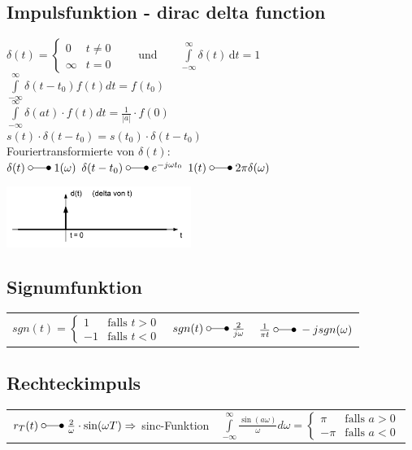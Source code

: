 	\subsection{Impulsfunktion - dirac delta function}
		\begin{minipage}{10cm}
			$\delta (t)=\begin{cases} 0 & t\ne 0\\\infty & t=0\end{cases} \qquad
			\text{und} \qquad \int\limits_{-\infty}^\infty \delta(t) \, \mathrm dt = 1 $\\
			$\int\limits_{-\infty}^{\infty}\delta(t-t_0)f(t)dt=f(t_0)$\\
			$\int\limits_{-\infty}^{\infty}\delta(at)\cdot f(t) dt = \frac{1}{|a|} \cdot f(0)$\\
			$s(t) \cdot \delta(t-t_0) = s(t_0)\cdot \delta(t-t_0)$\\
			Fouriertransformierte von $\delta(t)$:\\
			$\delta(t) \; \laplace \; 1(\omega)$ \hspace{0.5cm}
			$\delta(t-t_0) \; \laplace \; e^{-j\omega t_0}$ \hspace{0.5cm}
			$1(t) \; \laplace \; 2\pi \delta(\omega)$
		\end{minipage}
		\begin{minipage}{8cm}
			\includegraphics[width=6cm]{./bilder/diracimpulse.png}
		\end{minipage}
		
	\subsection{Signumfunktion}
		\begin{tabular}{p{6cm} p{6cm} p{6cm}}
			$sgn(t) = \begin{cases} 1 & \text{falls }t > 0 \\ -1 & \text{falls }t < 0 \end{cases}$ &
			$sgn(t) \; \laplace \; \frac{2}{j\omega}$ &
			$\frac{1}{\pi t} \; \laplace \; -j sgn(\omega)$
		\end{tabular}
		
	\subsection{Rechteckimpuls}
		\begin{tabular}{p{9cm} p{9cm}}
			$r_T(t) \; \laplace \; \frac{2}{\omega} \cdot \sin(\omega T) \Rightarrow$ sinc-Funktion &
			$\int\limits_{-\infty}^{\infty} \frac{\sin(a \omega)}{\omega} d\omega = 
			\begin{cases} \pi & \text{falls }a > 0 \\ -\pi & \text{falls }a < 0 \end{cases}$
		\end{tabular}